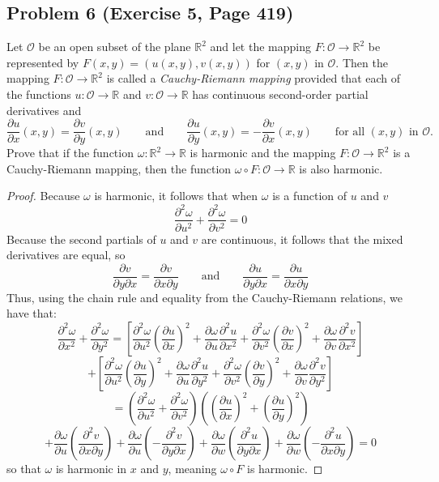 \documentclass{article}
\begin{document}
\subsection*{Problem 6 (Exercise 5, Page 419)}
Let $\mathcal{O}$ be an open subset of the plane $\mathbb{R}^2$ and let the mapping $F \colon \mathcal{O} \to \mathbb{R}^2$ be represented by $F(x, y) = (u(x, y), v(x, y))$ for $(x, y)$ in $\mathcal{O}$. Then the mapping $F\colon \mathcal{O} \to \mathbb{R}^2$ is called a \textit{Cauchy-Riemann mapping} provided that each of the functions $u \colon \mathcal{O} \to \mathbb{R}$ and $v\colon \mathcal{O} \to \mathbb{R}$ has continuous second-order partial derivatives and 
\[ \frac{\partial u}{\partial x}(x, y) = \frac{\partial v}{\partial y}(x, y) \qquad \text{and} \qquad \frac{\partial u}{\partial y}(x, y) = -\frac{\partial v}{\partial x}(x, y) \qquad \text{for all $(x, y)$ in $\mathcal{O}$}.\]
Prove that if the function $\omega \colon \mathbb{R}^2 \to \mathbb{R}$ is harmonic and the mapping $F \colon \mathcal{O} \to \mathbb{R}^2$ is a Cauchy-Riemann mapping, then the function $ \omega \circ F \colon \mathcal{O} \to \mathbb{R}$ is also harmonic.
\begin{proof}
Because $\omega$ is harmonic, it follows that when $\omega$ is a function of $u$ and $v$
\[ \frac{\partial^2 \omega}{\partial u^2} + \frac{\partial^2 \omega}{\partial v^2} = 0\]
Because the second partials of $u$ and $v$ are continuous, it follows that the mixed derivatives are equal, so
\[ \frac{\partial v}{\partial y \partial x} = \frac{\partial v}{\partial x \partial y} \qquad \text{and} \qquad \frac{\partial u}{\partial y \partial x} = \frac{\partial u}{\partial x \partial y}\]
Thus, using the chain rule and equality from the Cauchy-Riemann relations, we have that:
\[ \frac{\partial^2 \omega}{\partial x^2} + \frac{\partial^2 \omega}{\partial y^2} = \left[\frac{\partial^2 \omega}{\partial u^2}\left(\frac{\partial u}{\partial x}\right)^2 + \frac{\partial \omega}{\partial u}\frac{\partial^2 u}{\partial x^2} + \frac{\partial^2 \omega}{\partial v^2}\left(\frac{\partial v}{\partial x}\right)^2 + \frac{\partial \omega}{\partial v}\frac{\partial^2 v}{\partial x^2}\right]\]
\[ + \left[\frac{\partial^2 \omega}{\partial u^2}\left(\frac{\partial u}{\partial y}\right)^2 + \frac{\partial \omega}{\partial u}\frac{\partial^2 u}{\partial y^2} + \frac{\partial^2 \omega}{\partial v^2}\left(\frac{\partial v}{\partial y}\right)^2 + \frac{\partial \omega}{\partial v}\frac{\partial^2 v}{\partial y^2}\right]\]
\[ = \left( \frac{\partial^2 \omega}{\partial u^2} + \frac{\partial^2 \omega}{\partial v^2}\right)\left(\left(\frac{\partial u}{\partial x}\right)^2 + \left(\frac{\partial u}{\partial y}\right)^2\right)\]
\[ + \frac{\partial \omega}{\partial u} \left(\frac{\partial^2 v}{\partial x\partial y}\right) + \frac{\partial \omega}{\partial u} \left(-\frac{\partial^2 v}{\partial y\partial x}\right) + \frac{\partial \omega}{\partial w} \left(\frac{\partial^2 u}{\partial y\partial x}\right) + \frac{\partial \omega}{\partial w} \left(-\frac{\partial^2 u}{\partial x\partial y}\right) = 0\]
so that $\omega$ is harmonic in $x$ and $y$, meaning $\omega \circ F$ is harmonic.

\end{proof}
\end{document}
